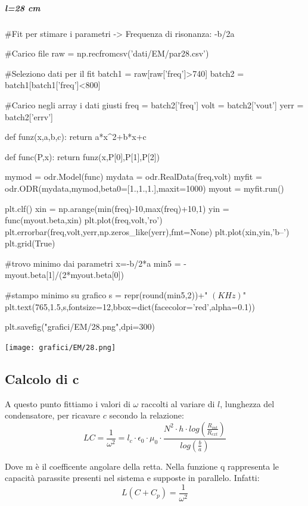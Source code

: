 \subparagraph*{l=28 cm}

\begin{sagesilent}
 #Fit per stimare i parametri -> Frequenza di risonanza: -b/2a

#Carico file
raw = np.recfromcsv('dati/EM/par28.csv')

#Seleziono dati per il fit
batch1 = raw[raw['freq']>740]
batch2 = batch1[batch1['freq']<800]

#Carico negli array i dati giusti
freq = batch2['freq']
volt = batch2['vout']
yerr = batch2['errv']


def funz(x,a,b,c):
    return a*x^2+b*x+c

def func(P,x):
    return funz(x,P[0],P[1],P[2])

mymod = odr.Model(func)
mydata = odr.RealData(freq,volt)
myfit = odr.ODR(mydata,mymod,beta0=[1.,1.,1.],maxit=1000)
myout = myfit.run()

plt.clf()
xin = np.arange(min(freq)-10,max(freq)+10,1)
yin = func(myout.beta,xin)
plt.plot(freq,volt,'ro')
plt.errorbar(freq,volt,yerr,np.zeros_like(yerr),fmt=None)
plt.plot(xin,yin,'b--')
plt.grid(True)

#trovo minimo dai parametri x=-b/2*a
min5 = -myout.beta[1]/(2*myout.beta[0]) 

#stampo minimo su grafico
s = repr(round(min5,2))+" $(KHz)$"
plt.text(765,1.5,s,fontsize=12,bbox=dict(facecolor='red',alpha=0.1))

plt.savefig("grafici/EM/28.png",dpi=300)
\end{sagesilent}



\texttt{[image: grafici/EM/28.png]}

\subsection*{Calcolo di c}

A questo punto fittiamo i valori di $\omega$ raccolti al variare di $l$, lunghezza del condensatore, per ricavare $c$ secondo la relazione:
\begin{equation}
 LC =\displaystyle \frac{1}{{\omega}^2} = l_c \cdot \epsilon_{0}\cdot \mu_{0}\cdot \frac{N^2 \cdot h \cdot log(\frac{R_{int}}{R_{ext}})}{log (\frac{b}{a})}
\end{equation}

Dove m è il coefficente angolare della retta. Nella funzione q rappresenta le capacità parassite presenti nel sistema e supposte in parallelo. Infatti:
$$L(C+C_p) = \frac{1}{\omega^2}$$

